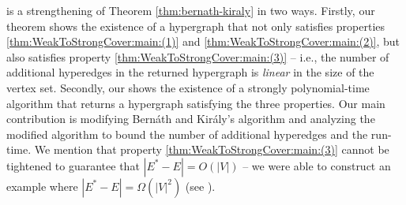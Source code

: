  is a strengthening of Theorem \ref{thm:bernath-kiraly} in two ways. Firstly, our theorem shows the existence of a hypergraph that not only satisfies properties \ref{thm:WeakToStrongCover:main:(1)} and \ref{thm:WeakToStrongCover:main:(2)}, but also satisfies property \ref{thm:WeakToStrongCover:main:(3)} -- i.e., the number of additional hyperedges in the returned hypergraph is \emph{linear} in the size of the vertex set. Secondly, our  shows the existence of a strongly polynomial-time algorithm that returns a hypergraph satisfying the three properties. 
Our main contribution is modifying Bern\'{a}th and Kir\'{a}ly's algorithm and analyzing the modified algorithm to bound the number of additional hyperedges and the run-time. 
We mention that property \ref{thm:WeakToStrongCover:main:(3)} cannot be tightened to guarantee that $|E^*-E|=O(|V|)$ -- we were able to construct an example where 
$|E^*-E|=\Omega(|V|^2)$ (see ). 


